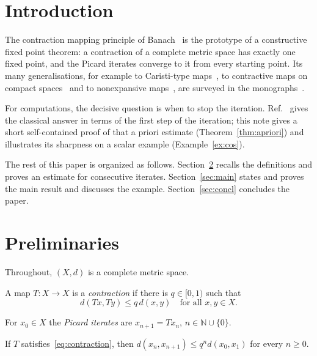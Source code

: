 \documentclass[axioms,article,submit,moreauthors]{Definitions/mdpi}
\newcommand{\N}{\mathbb{N}}
\begin{document}
\section{Introduction}

The contraction mapping principle of Banach~\cite{banach1922} is the prototype of a constructive fixed point theorem: a contraction of a complete metric space has exactly one fixed point, and the Picard iterates converge to it from every starting point. Its many generalisations, for example to Caristi-type maps~\cite{caristi1976}, to contractive maps on compact spaces~\cite{edelstein1962} and to nonexpansive maps~\cite{kirk1965}, are surveyed in the monographs~\cite{goebel1990,granas2003}.

For computations, the decisive question is when to stop the iteration. Ref.~\cite{granas2003} gives the classical answer in terms of the first step of the iteration; this note gives a short self-contained proof of that a priori estimate (Theorem~\ref{thm:apriori}) and illustrates its sharpness on a scalar example (Example~\ref{ex:cos}).

The rest of this paper is organized as follows. Section~\ref{sec:prelim} recalls the definitions and proves an estimate for consecutive iterates. Section~\ref{sec:main} states and proves the main result and discusses the example. Section~\ref{sec:concl} concludes the paper.

\section{Preliminaries}\label{sec:prelim}

Throughout, $(X,d)$ is a complete metric space.

\begin{Definition}\label{def:contraction}
A map $T\colon X\to X$ is a \emph{contraction} if there is $q\in[0,1)$ such that
\begin{equation}\label{eq:contraction}
d(Tx,Ty)\le q\,d(x,y)\quad\text{for all } x,y\in X.
\end{equation}
\end{Definition}

For $x_0\in X$ the \emph{Picard iterates} are $x_{n+1}=Tx_n$, $n\in\N\cup\{0\}$.

\begin{Lemma}\label{lem:steps}
If $T$ satisfies~\eqref{eq:contraction}, then $d(x_n,x_{n+1})\le q^n d(x_0,x_1)$ for every $n\ge 0$.
\end{Lemma}
\end{document}
